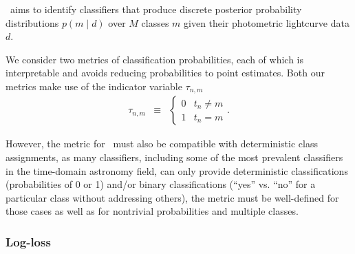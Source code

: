 \plasticc\ aims to identify classifiers that produce discrete posterior probability distributions $p(m \mid d)$ over $M$ classes $m$ given their photometric lightcurve data $d$.

We consider two  metrics of classification probabilities, each of which is interpretable and avoids reducing probabilities to point estimates.
Both our metrics make use of the indicator variable $\tau_{n, m}$ 
\begin{eqnarray}
  \label{eq:indicator}
  \tau_{n, m} &\equiv& \begin{cases}
  0 & t_{n} \neq m\\
  1 & t_{n} = m
  \end{cases}.
\end{eqnarray}

However, the metric for \plasticc\ must also be compatible with deterministic class assignments, as many classifiers, including some of the most prevalent classifiers in the time-domain astronomy field, can only provide deterministic classifications (probabilities of 0 or 1) and/or binary classifications (``yes'' vs. ``no'' for a particular class without addressing others), the metric must be well-defined for those cases as well as for nontrivial probabilities and multiple classes.


\subsubsection{Log-loss}
\label{sec:logloss}

